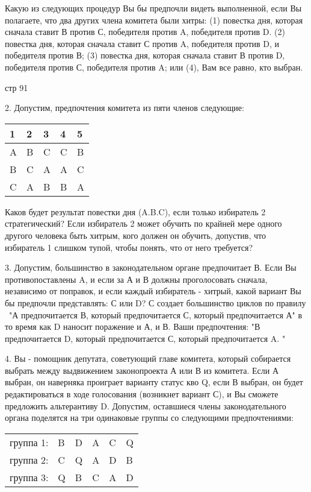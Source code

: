 \documentclass[a4paper,12pt]{article}
\begin{document}
Какую из следующих процедур Вы бы предпочли видеть
выполненной, если Вы полагаете, что два других
члена комитета были хитры: (1) повестка дня,
которая сначала ставит В против С, победителя
против A, победителя против D. (2) повестка дня,
которая сначала ставит С против A, победителя
против D, и победителя против В; (3) повестка дня,
которая сначала ставит В против D, победителя
против С, победителя против A; или (4), Вам все
равно, кто выбран.

стр 91

2. Допустим, предпочтения комитета из пяти членов
следующие:

\begin{tabular}{|lllll|}
\hline 1 & 2 & 3 & 4 & 5 \\ \hline A & B & C & C &
B \\ B & C & A & A & C \\ C & A & B & B & A \\
\hline
\end{tabular}

Каков будет результат повестки дня (A.B.C), если
только избиратель 2 стратегический? Если избиратель
2 может обучить по крайней мере одного другого
человека быть хитрым, кого должен он обучить,
допустив, что избиратель 1 слишком тупой, чтобы
понять, что от него требуется?

3. Допустим, большинство в законодательном органе
предпочитает В. Если Вы противопоставлены A, и если
за А и В должны проголосовать сначала, независимо
от поправок, и если каждый избиратель - хитрый,
какой вариант Вы бы предпочли представлять: С или
D? С создает большинство циклов по правилу \ "А
предпочитается В, который предпочитается С, который
предпочитается А" в то время как D наносит
поражение и А, и В. Ваши предпочтения: "В
предпочитается D, который предпочитается С, который
предпочитается A. "

4. Вы - помощник депутата, советующий главе
комитета, который собирается выбрать между
выдвижением законопроекта А или В из комитета. Если
А выбран, он наверняка проиграет варианту статус
кво Q, если В выбран, он будет редактироваться в
ходе голосования (возникнет вариант С), и Вы
сможете предложить альтерантиву D. Допустим,
оставшиеся члены законодательного органа поделятся
на три одинаковые группы со следующими
предпочтениями:

\begin{tabular}{llllll}
группа 1: & B & D & A & C & Q \\ группа 2: & C & Q & A & D & B \\
группа 3: & Q & B & C & A & D\end{tabular}
\end{document}
